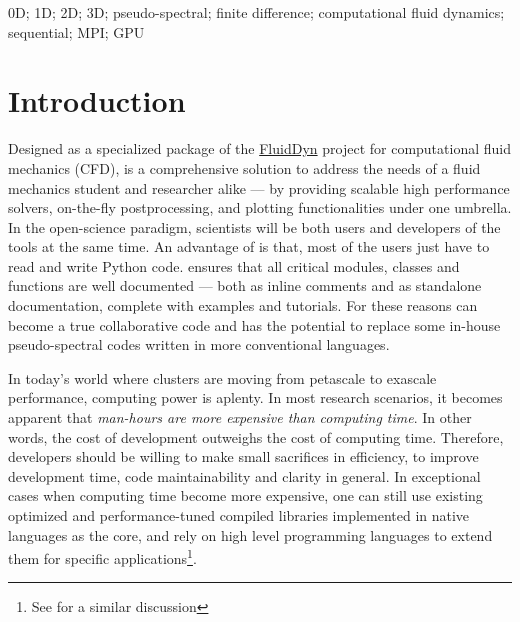 0D; 1D; 2D; 3D; pseudo-spectral; finite difference; computational fluid
dynamics; sequential; MPI; GPU

\section{Introduction}


Designed as a specialized package of the
\href{https://fluiddyn.readthedocs.io}{FluidDyn} project for computational fluid
mechanics (CFD),  is a comprehensive solution to address the needs
of a fluid mechanics student and researcher alike --- by providing scalable high
performance solvers, on-the-fly postprocessing, and plotting functionalities under
one umbrella.  In the open-science paradigm, scientists will be both users and
developers of the tools at the same time.
%
An advantage of  is that, most of the users just have to read and
write Python code.   ensures that all critical modules, classes and
functions are well documented --- both as inline comments and as standalone
documentation, complete with examples and tutorials.  For these reasons
 can become a true collaborative code and has the potential to
replace some in-house pseudo-spectral codes written in more conventional
languages.

In today's world where clusters are moving from petascale to exascale
performance, computing power is aplenty. In most research scenarios, it becomes
apparent that \emph{man-hours are more expensive than computing time}. In other
words, the cost of development outweighs the cost of computing time. Therefore,
developers should be willing to make small sacrifices in efficiency, to improve
development time, code maintainability and clarity in general. In exceptional
cases when computing time become more expensive, one can still use
existing optimized and performance-tuned compiled libraries implemented in
native languages as the core, and rely on high level programming languages to
extend them for specific applications\footnote{See
  \citet{ramachandran_pysph_2016} for a similar discussion}.


